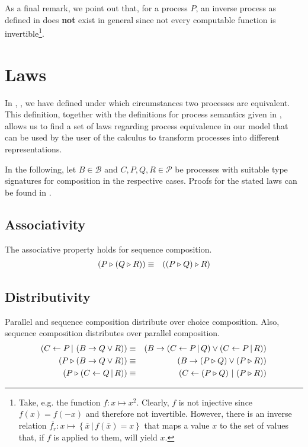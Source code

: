 

As a final remark, we point out that, for a process $P$, an inverse process as defined in  does \textbf{not} exist in general since not every computable function is invertible\footnote{Take, e.g. the function $f \colon x \mapsto x^2$. Clearly, $f$ is not injective since $f \left( x \right) = f \left( -x \right)$ and therefore not invertible. However, there is an inverse relation $\overline{f_r} \colon x \mapsto \left\{ \overline{x} \,|\, f \left( \overline{x} \right) = x \right\}$ that maps a value $x$ to the set of values that, if $f$ is applied to them, will yield $x$.}.



\clearpage
\section{Laws}
\label{chp:laws}
In , , we have defined under which circumstances two processes are equivalent. This definition, together with the definitions for process semantics given in , allows us to find a set of laws regarding process equivalence in our model that can be used by the user of the calculus to transform processes into different representations.

In the following, let $B \in \mathcal{B}$ and $C, P, Q, R \in \mathcal{P}$ be processes with suitable type signatures for composition in the respective cases. Proofs for the stated laws can be found in .

\subsection{Associativity}
The associative property holds for sequence composition.
\begin{eqnarray*}
  \left( P \triangleright \left( Q \triangleright R \right) \right) & \equiv & \left( \left( P \triangleright Q \right) \triangleright R \right)
\end{eqnarray*}

\subsection{Distributivity}
Parallel and sequence composition distribute over choice composition. Also, sequence composition distributes over parallel composition.
\begin{eqnarray*}
  \left( C \gets P \, | \, \left( B \to Q \vee R \right) \right) & \equiv & \left( B \to \left( C \gets P \, | \, Q \right) \vee \left( C \gets P \, | \, R \right) \right) \\
  \left( P \triangleright \left( B \to Q \vee R \right) \right) & \equiv & \left( B \to \left( P \triangleright Q \right) \vee \left( P \triangleright R \right) \right) \\
  \left( P \triangleright \left( C \gets Q \, | \, R \right) \right) & \equiv & \left( C \gets \left( P \triangleright Q \right) \, | \, \left( P \triangleright R \right) \right)
\end{eqnarray*}

